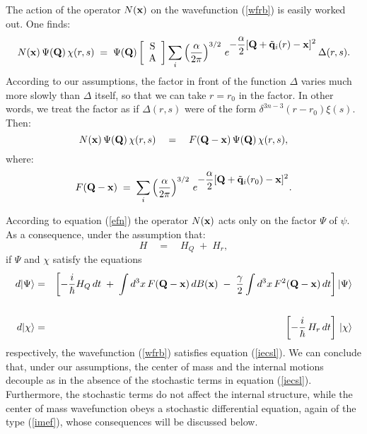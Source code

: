 \documentclass[10pt,a4paper]{article}
\begin{document}
The action of the operator $N({\bf x})$ on the wavefunction
(\ref{wfrb}) is easily worked out. One finds:
\begin{equation}
N({\bf x})\, \Psi ({\bf Q})\, \chi (r, s) \; = \; \Psi ({\bf Q})
\left[
\begin{array}{c}
\makebox{S} \\ \makebox{A}
\end{array}
\right]
 \sum_{i} \left(\frac{\alpha}{2\pi}\right)^{3/2}\,
e^{\displaystyle  - \frac{\alpha}{2} [{\bf Q} + \tilde{\bf
q}_{i}(r) - {\bf x} ]^{2}}\, \Delta (r,s).
\end{equation}
According to our assumptions, the factor in front of the function
$\Delta$ varies much more slowly than $\Delta$ itself, so that we
can take $r = r_{0}$ in the factor. In other words, we treat the
factor as if $\Delta (r, s)$ were of the form $\delta^{3n-3} (r -
r_{0}) \xi (s)$. Then:
\begin{equation} \label{efn}
N({\bf x})\, \Psi ({\bf Q})\, \chi (r, s) \quad = \quad F({\bf Q}
- {\bf x})\, \Psi ({\bf Q})\, \chi (r, s) ,
\end{equation}
where:
\begin{equation} \label{ecslw}
F({\bf Q} - {\bf x})\; = \; \sum_{i}
\left(\frac{\alpha}{2\pi}\right)^{3/2}\, e^{\displaystyle  -
\frac{\alpha}{2} [{\bf Q} + \tilde{\bf q}_{i}(r_{0}) - {\bf x}
]^{2}}.
\end{equation}

According to equation (\ref{efn}) the operator $N({\bf x})$ acts
only on the factor $\Psi$ of $\psi$. As a consequence, under the
assumption that:
\[
H \quad = \quad  H_{Q}\; + \; H_{r},
\]
if $\Psi$ and $\chi$ satisfy the equations
\begin{eqnarray}
d |\Psi \rangle & = & \left[ - \frac{i}{\hbar} H_{Q}\, dt  \; + \;
\int d^{3} x\, F({\bf Q} - {\bf x})\, dB({\bf x}) \; - \;
\frac{\gamma}{2} \int d^{3} x\, F^{2}({\bf Q} - {\bf x})\, dt
\right] |\Psi\rangle \nonumber \\
& & \label{cmie} \\
d |\chi\rangle & = &  \left[ - \frac{i}{\hbar}\, H_{ r}\, dt
\right]\, |\chi\rangle \label{odghj}
\end{eqnarray}
respectively, the wavefunction (\ref{wfrb}) satisfies equation
(\ref{iecsl}). We can conclude that, under our assumptions, the
center of mass and the internal motions decouple as in the absence
of the stochastic terms in equation (\ref{iecsl}). Furthermore,
the stochastic terms do not affect the internal structure, while
the center of mass wavefunction obeys a stochastic differential
equation, again of the type (\ref{imef}), whose consequences will
be discussed below.
\end{document}
